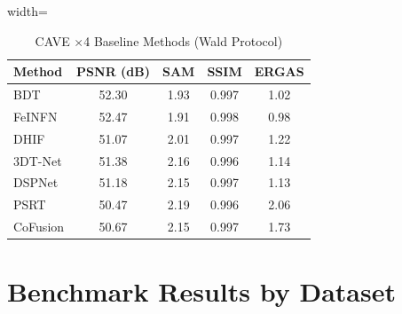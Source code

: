 \documentclass[conference]{IEEEtran}
\begin{document}
\begin{table}[htbp]
\caption{CAVE $\times$4 Baseline Methods (Wald Protocol)}
\label{tab:baseline}
\begin{center}
\begin{adjustbox}{width=\columnwidth}
\begin{tabular}{lcccc}
\toprule
\textbf{Method} & \textbf{PSNR (dB)} & \textbf{SAM} & \textbf{SSIM} & \textbf{ERGAS} \\
\midrule
BDT & 52.30 & 1.93 & 0.997 & 1.02 \\
FeINFN & 52.47 & 1.91 & 0.998 & 0.98 \\
DHIF & 51.07 & 2.01 & 0.997 & 1.22 \\
3DT-Net & 51.38 & 2.16 & 0.996 & 1.14 \\
DSPNet & 51.18 & 2.15 & 0.997 & 1.13 \\
PSRT & 50.47 & 2.19 & 0.996 & 2.06 \\
CoFusion & 50.67 & 2.15 & 0.997 & 1.73 \\
\bottomrule
\end{tabular}
\end{adjustbox}
\end{center}
\end{table}

\section{Benchmark Results by Dataset}
\end{document}
